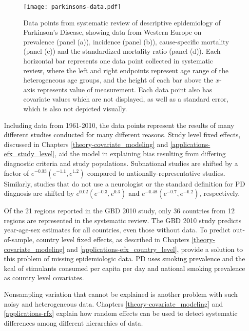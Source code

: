     \begin{figure}[h]
        \begin{center}
            \texttt{[image: parkinsons-data.pdf]}
            \caption{Data points from systematic review of descriptive
              epidemiology of Parkinson's Disease, showing data from
              Western Europe on prevalence (panel (a)), incidence
              (panel (b)), cause-specific mortality (panel (c)) and
              the standardized mortality ratio (panel (d)).  Each
              horizontal bar represents one data point collected in
              systematic review, where the left and right endpoints
              represent age range of the heterogeneous age groups, and
              the height of each bar above the $x$-axis represents
              value of measurement.  Each data point also has
              covariate values which are not displayed, as well as a
              standard error, which is also not depicted visually.}
            \label{fig:intro-parkinsons data}
        \end{center}
    \end{figure}

Including data from 1961-2010, the data points represent the results
of many different studies conducted for many different reasons.  Study
level fixed effects, discussed in Chapters \ref{theory-covariate_modeling} and
\ref{applications-efx_study_level}, aid the model in explaining bias
resulting from differing diagnostic criteria and study populations.  Subnational 
studies are shifted by a factor of $e^{-0.03} (e^{-1.1}, e^{1.2})$
compared to nationally-representative studies.  Similarly, studies that 
do not use a neurologist or the standard definition for PD diagnosis are shifted 
by $e^{0.02} (e^{-0.3}, e^{0.3})$ and $e^{-0.48} (e^{-0.7}, e^{-0.2})$,
respectively.

Of the 21 regions reported in the GBD 2010 study, only 36 countries
from 12 regions are represented in the systematic review.  The GBD
2010 study predicts year-age-sex estimates for all countries, even
those without data.  To predict out-of-sample, country level fixed
effects, as described in Chapters \ref{theory-covariate_modeling} and
\ref{applications-efx_country_level}, provide a solution to this
problem of missing epidemiologic data.  PD uses smoking prevalence and the 
kcal of stimulants consumed per capita per day and national smoking prevalence 
as country level covariates.

Nonsampling variation that cannot be explained is another problem with
such noisy and heterogeneous data.  Chapters
\ref{theory-covariate_modeling} and \ref{applications-rfx} explain how
random effects can be used to detect systematic differences among
different hierarchies of data.

